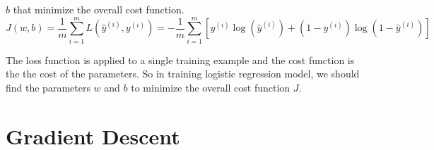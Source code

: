\documentclass[a4paper]{article}
\begin{document}
$b$ that minimize the overall cost function.
%
\begin{equation}
J\left(w,b\right)=\frac{1}{m}\sum_{i=1}^{m}L\left(\hat{y}^{\left(i\right)},y^{\left(i\right)}\right) = -\frac{1}{m}\sum_{i=1}^{m}\left[y^{\left(i\right)}\log\left(\hat{y}^{\left(i\right)}\right) +
\left(1-y^{\left(i\right)}\right)\log\left(1-\hat{y}^{\left(i\right)}\right)\right]
\label{eq3}
\end{equation}
%
\par
The loss function is applied to a single training example and the cost function is 
the the cost of the parameters. So in training logistic regression model, we should find
the parameters $w$ and $b$ to minimize the overall cost function $J$.
\section{Gradient Descent}
\end{document}
